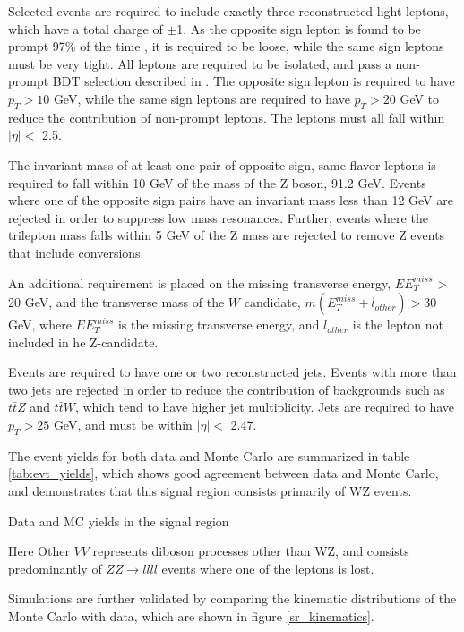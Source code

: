 \documentclass[NOTE, atlasdraft=true, texlive=2016, UKenglish]{\ATLASLATEXPATH atlasdoc}
\begin{document}
Selected events are required to include exactly three reconstructed light leptons, which have a total charge of $\pm$1. As the opposite sign lepton is found to be prompt 97\% of the time \cite{ttH_paper}, it is required to be loose, while the same sign leptons must be very tight. All leptons are required to be isolated, and pass a non-prompt BDT selection described in \cite{ttH_paper}. The opposite sign lepton is required to have $p_T > 10$ GeV, while the same sign leptons are required to have $p_T > 20$ GeV to reduce the contribution of non-prompt leptons. The leptons must all fall within $|\eta| <$ 2.5.

The invariant mass of at least one pair of opposite sign, same flavor leptons is required to fall within 10 GeV of the mass of the Z boson, 91.2 GeV. Events where one of the opposite sign pairs have an invariant mass less than 12 GeV are rejected in order to suppress low mass resonances. Further, events where the trilepton mass falls within 5 GeV of the Z mass are rejected to remove Z events that include conversions.

An additional requirement is placed on the missing transverse energy, $EE^{miss}_T$ > 20 GeV, and the transverse mass of the $W$ candidate, $m(E^{miss}_T + l_{other}) > 30$ GeV, where $EE^{miss}_T$ is the missing transverse energy, and $l_{other}$ is the lepton not included in he Z-candidate. 

Events are required to have one or two reconstructed jets. Events with more than two jets are rejected in order to reduce the contribution of backgrounds such as $t\bar{t}Z$ and $t\bar{t}W$, which tend to have higher jet multiplicity. Jets are required to have $p_T > 25$ GeV, and must be within $|\eta| <$ 2.47. 

The event yields for both data and Monte Carlo are summarized in table \ref{tab:evt_yields}, which shows good agreement between data and Monte Carlo, and demonstrates that this signal region consists primarily of WZ events.

\begin{table}[H]
    \centering
        
    \caption{Data and MC yields in the signal region}
    \label{tab:evt_yields}
\end{table}

Here Other $VV$ represents diboson processes other than WZ, and consists predominantly of $ZZ\rightarrow llll$ events where one of the leptons is lost.

Simulations are further validated by comparing the kinematic distributions of the Monte Carlo with data, which are shown in figure \ref{sr_kinematics}.
\end{document}
